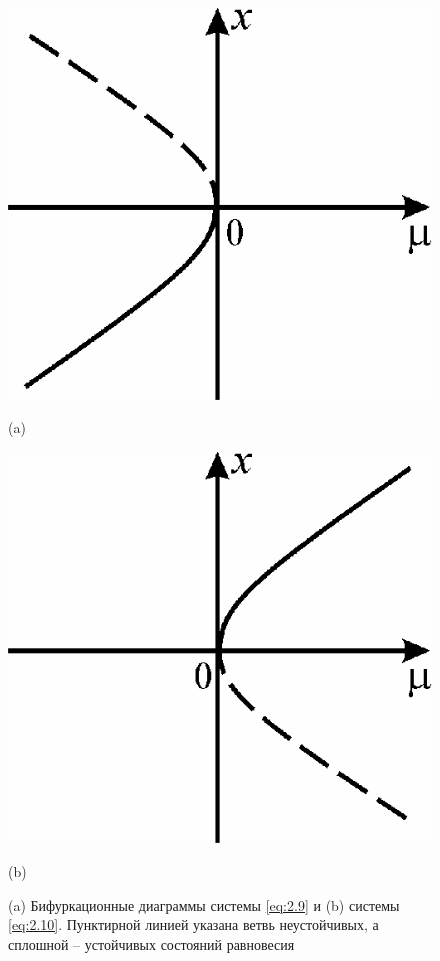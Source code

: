  \begin{figure}[h!]
 	\centering
 	\begin{minipage}{0.49\linewidth}
 		\centering
 		\includegraphics[]{fig/lect2/6a}

 		(a)
 		\label{fig:2.6a}
 	\end{minipage}
 	\hfill
 	\begin{minipage}{0.49\linewidth}
 		\centering
 		\includegraphics[]{fig/lect2/6b}

 		(b)
 		\label{fig:2.6b}
 	\end{minipage}
 	\caption{ (a) Бифуркационные диаграммы системы \eqref{eq:2.9} и (b) системы \eqref{eq:2.10}. Пунктирной линией указана ветвь неустойчивых, а сплошной -- устойчивых состояний равновесия}
 	\label{fig:2.6}
 	
 \end{figure}


